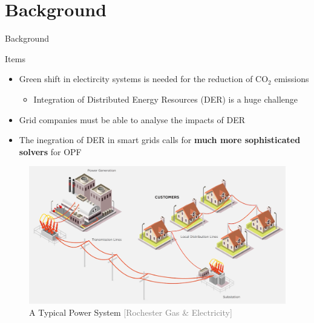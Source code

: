 \documentclass{beamer}
\begin{document}
\section{Background}
\begin{frame}{Background}
\begin{block}{Items}

\begin{itemize}
\item <1-> \small Green shift in electircity systems is needed for the reduction of $\mathrm{CO_2}$ emissions
\begin{itemize}
\item<2-> \tiny  Integration of Distributed Energy Resources (DER) is a huge challenge
\end{itemize}
\item<3->\small Grid companies must be able to analyse the impacts of DER 
\item<5->\small The inegration of DER in smart grids calls for \textbf{much more sophisticated solvers} for OPF
\end{itemize}
\end{block}
\begin{figure}
\includegraphics[scale=0.06]{Figures/PowerSys.png}
 \caption{A Typical Power System \textcolor{gray}{\tiny[Rochester Gas \& Electricity]}}
\end{figure}

\end{frame}
\end{document}

